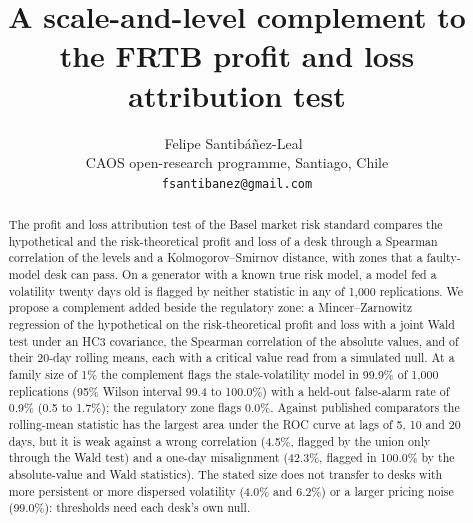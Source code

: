 \documentclass[11pt]{article}
\title{A scale-and-level complement to the FRTB profit and loss attribution test}
\author{Felipe Santib\'a\~nez-Leal~\orcidlink{0000-0002-0150-3246}\\
\small CAOS open-research programme, Santiago, Chile\\
\small \texttt{fsantibanez@gmail.com}}
\date{\docdate}
\begin{document}
\maketitle
\headerblock

\begin{abstract}
The profit and loss attribution test of the Basel market risk standard compares the hypothetical and the risk-theoretical profit and loss of a desk through a Spearman correlation of the levels and a Kolmogorov--Smirnov distance, with zones that a faulty-model desk can pass.
On a generator with a known true risk model, a model fed a volatility twenty days old is flagged by neither statistic in any of 1,000 replications.
We propose a complement added beside the regulatory zone: a Mincer--Zarnowitz regression of the hypothetical on the risk-theoretical profit and loss with a joint Wald test under an HC3 covariance, the Spearman correlation of the absolute values, and of their 20-day rolling means, each with a critical value read from a simulated null.
At a family size of 1\% the complement flags the stale-volatility model in 99.9\% of 1,000 replications (95\% Wilson interval 99.4 to 100.0\%) with a held-out false-alarm rate of 0.9\% (0.5 to 1.7\%); the regulatory zone flags 0.0\%.
Against published comparators the rolling-mean statistic has the largest area under the ROC curve at lags of 5, 10 and 20 days, but it is weak against a wrong correlation (4.5\%, flagged by the union only through the Wald test) and a one-day misalignment (42.3\%, flagged in 100.0\% by the absolute-value and Wald statistics).
The stated size does not transfer to desks with more persistent or more dispersed volatility (4.0\% and 6.2\%) or a larger pricing noise (99.0\%): thresholds need each desk's own null.
\end{abstract}
















\end{document}
